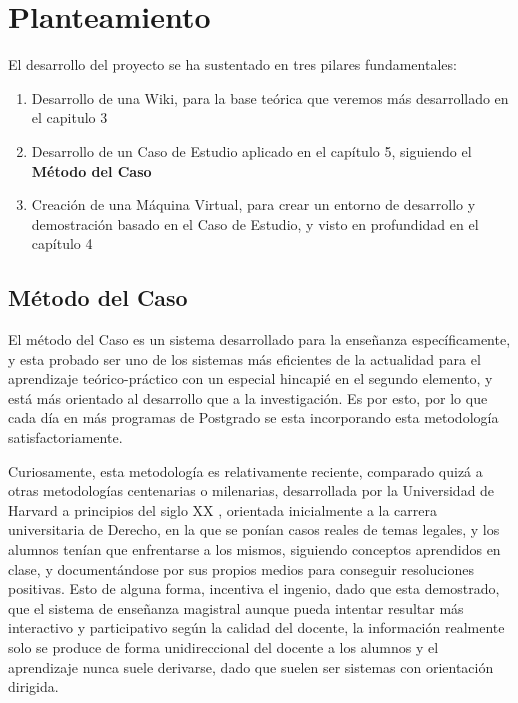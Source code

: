 
\section{Planteamiento}

El desarrollo del proyecto se ha sustentado en tres pilares fundamentales:

\begin{enumerate}
	\item Desarrollo de una Wiki, para la base teórica que veremos más desarrollado en el capitulo 3
	\item Desarrollo de un Caso de Estudio aplicado en el capítulo 5, siguiendo el \textbf{Método del Caso}
	\item Creación de una Máquina Virtual, para crear un entorno de desarrollo y demostración basado en el Caso de Estudio, y visto en profundidad en el capítulo 4
\end{enumerate}

\subsection{Método del Caso}

El método del Caso es un sistema desarrollado para la enseñanza específicamente, y esta probado ser uno de los sistemas más eficientes de la actualidad para el aprendizaje teórico-práctico con un especial hincapié en el segundo elemento, y está más orientado al desarrollo que a la investigación. Es por esto, por lo que cada día en más programas de Postgrado se esta incorporando esta metodología satisfactoriamente.

Curiosamente, esta metodología es relativamente reciente, comparado quizá a otras metodologías centenarias o milenarias, desarrollada por la Universidad de Harvard\cite{website:hbsp} a principios del siglo XX \cite{website:voipinfo}, orientada inicialmente a la carrera universitaria de Derecho, en la que se ponían casos reales de temas legales, y los alumnos tenían que enfrentarse a los mismos, siguiendo conceptos aprendidos en clase, y documentándose por sus propios medios para conseguir resoluciones positivas. Esto de alguna forma, incentiva el ingenio, dado que esta demostrado, que el sistema de enseñanza magistral aunque pueda intentar resultar más interactivo y participativo según la calidad del docente, la información realmente solo se produce de forma unidireccional del docente a los alumnos y el aprendizaje nunca suele derivarse, dado que suelen ser sistemas con orientación dirigida.

